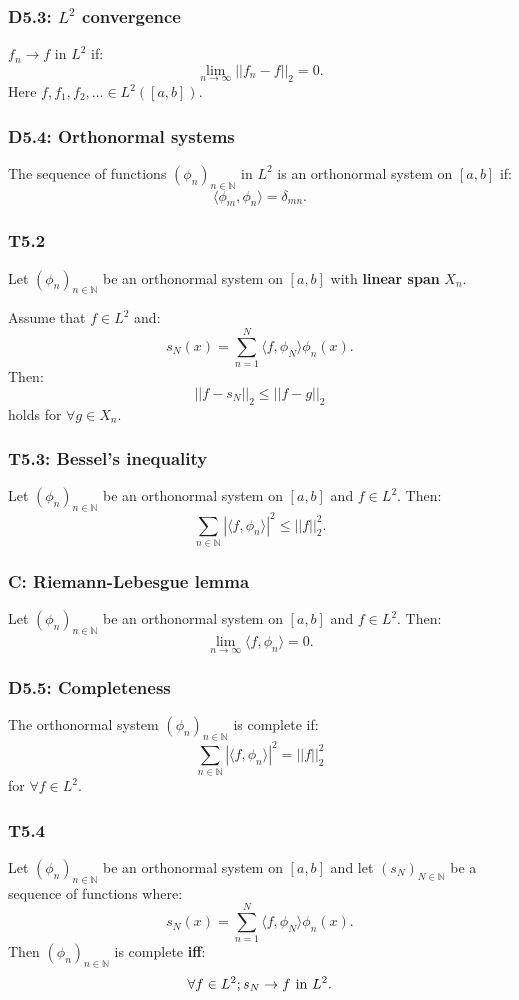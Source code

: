 \documentclass{article}
\begin{document}
\begin{multicols*}{3}
\subsubsection*{D5.3: $L^2$ convergence}
$f_n\rightarrow f$ in $L^2$ if:
$$\lim_{n\rightarrow\infty}||f_n-f||_2=0.$$
Here $f,f_1,f_2,\ldots\in L^2([a,b])$.

\subsubsection*{D5.4: Orthonormal systems}
The sequence of functions $(\phi_n)_{n\in\mathbb{N}}$ 
in $L^2$ is an orthonormal system on $[a,b]$ if:
$$\langle\phi_m,\phi_n \rangle=\delta_{mn}.$$

\subsubsection*{T5.2}
Let $(\phi_n)_{n\in\mathbb{N}}$ be an
orthonormal system on $[a,b]$ with
\textbf{linear span} $X_n$. 

Assume that $f\in L^2$ and:
$$s_N(x)=\sum_{n=1}^{N}
\langle f,\phi_N\rangle\phi_n(x).$$
Then:
$$||f-s_N||_2\leq||f-g||_2$$
holds for $\forall g\in X_n$.

\subsubsection*{T5.3: Bessel's inequality}
Let $(\phi_n)_{n\in\mathbb{N}}$ be an
orthonormal system on $[a,b]$ and $f\in L^2$.
Then:
$$\sum_{n\in\mathbb{N}}|
\langle f,\phi_n\rangle|^2
\leq||f||_2^2.$$

\subsubsection*{C: Riemann-Lebesgue lemma}
Let $(\phi_n)_{n\in\mathbb{N}}$ be an
orthonormal system on $[a,b]$ and $f\in L^2$.
Then:
$$\lim_{n\rightarrow\infty}\langle f,\phi_n\rangle=0.$$

\subsubsection*{D5.5: Completeness}
The orthonormal system $(\phi_n)_{n\in\mathbb{N}}$ 
is complete if:
$$\sum_{n\in\mathbb{N}}|
\langle f,\phi_n\rangle|^2=||f||_2^2$$
for $\forall f\in L^2$.

\subsubsection*{T5.4}
Let $(\phi_n)_{n\in\mathbb{N}}$ be an
orthonormal system on $[a,b]$ and let
$(s_N)_{N\in\mathbb{N}}$ be a sequence of functions
where:
$$s_N(x)=\sum_{n=1}^{N}
\langle f,\phi_N\rangle\phi_n(x).$$
Then $(\phi_n)_{n\in\mathbb{N}}$
is complete \textbf{if{}f}:
$$\forall f\in L^2; s_N\rightarrow f
\hspace{0.05in}\text{in $L^2$}.$$


\end{multicols*}
\end{document}
